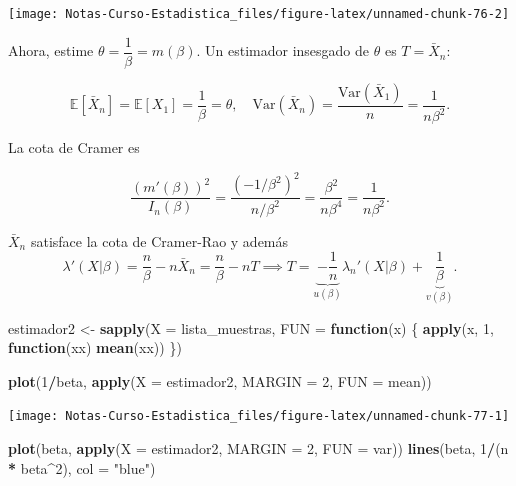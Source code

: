 \documentclass[
  12pt,
]{book}
\newenvironment{Shaded}{\begin{snugshade}}{\end{snugshade}}
\newcommand{\ControlFlowTok}[1]{\textcolor[rgb]{0.13,0.29,0.53}{\textbf{#1}}}
\newcommand{\DataTypeTok}[1]{\textcolor[rgb]{0.13,0.29,0.53}{#1}}
\newcommand{\DecValTok}[1]{\textcolor[rgb]{0.00,0.00,0.81}{#1}}
\newcommand{\KeywordTok}[1]{\textcolor[rgb]{0.13,0.29,0.53}{\textbf{#1}}}
\newcommand{\NormalTok}[1]{#1}
\newcommand{\OperatorTok}[1]{\textcolor[rgb]{0.81,0.36,0.00}{\textbf{#1}}}
\newcommand{\StringTok}[1]{\textcolor[rgb]{0.31,0.60,0.02}{#1}}
\begin{document}
\begin{center}\texttt{[image: Notas-Curso-Estadistica\_files/figure-latex/unnamed-chunk-76-2]} \end{center}

Ahora, estime \(\theta = \dfrac 1\beta = m(\beta)\). Un estimador insesgado de \(\theta\) es \(T =\bar X_n\):

\[\mathbb E[\bar X_n] = \mathbb E
[X_1] = \dfrac 1\beta  = \theta, \quad \text{Var}(\bar X_n) = \dfrac{\text{Var}(\bar X_1) }{n} = \dfrac 1{n\beta^2}.\]

La cota de Cramer es

\[\dfrac{(m'(\beta))^2}{I_n(\beta)} = \dfrac{(-1/\beta^2)^2}{n/\beta^2} = \dfrac{\beta^2}{n\beta^4} = \dfrac{1}{n\beta^2}.\]

\(\bar X_n\) satisface la cota de Cramer-Rao y además
\[\lambda'(X|\beta) = \dfrac n\beta - n\bar X_n =\dfrac n\beta - nT \implies T = \underbrace{-\dfrac 1n}_{u(\beta)}\lambda_n'(X|\beta)+ \underbrace{\dfrac 1\beta}_{v(\beta)}. \]

\begin{Shaded}
\begin{Highlighting}[]
\NormalTok{estimador2 \textless{}{-}}\StringTok{ }\KeywordTok{sapply}\NormalTok{(}\DataTypeTok{X =}\NormalTok{ lista\_muestras, }\DataTypeTok{FUN =} \ControlFlowTok{function}\NormalTok{(x) \{}
    \KeywordTok{apply}\NormalTok{(x, }\DecValTok{1}\NormalTok{, }\ControlFlowTok{function}\NormalTok{(xx) }\KeywordTok{mean}\NormalTok{(xx))}
\NormalTok{\})}

\KeywordTok{plot}\NormalTok{(}\DecValTok{1}\OperatorTok{/}\NormalTok{beta, }\KeywordTok{apply}\NormalTok{(}\DataTypeTok{X =}\NormalTok{ estimador2, }\DataTypeTok{MARGIN =} \DecValTok{2}\NormalTok{, }\DataTypeTok{FUN =}\NormalTok{ mean))}
\end{Highlighting}
\end{Shaded}

\begin{center}\texttt{[image: Notas-Curso-Estadistica\_files/figure-latex/unnamed-chunk-77-1]} \end{center}

\begin{Shaded}
\begin{Highlighting}[]
\KeywordTok{plot}\NormalTok{(beta, }\KeywordTok{apply}\NormalTok{(}\DataTypeTok{X =}\NormalTok{ estimador2, }\DataTypeTok{MARGIN =} \DecValTok{2}\NormalTok{, }\DataTypeTok{FUN =}\NormalTok{ var))}
\KeywordTok{lines}\NormalTok{(beta, }\DecValTok{1}\OperatorTok{/}\NormalTok{(n }\OperatorTok{*}\StringTok{ }\NormalTok{beta}\OperatorTok{\^{}}\DecValTok{2}\NormalTok{), }\DataTypeTok{col =} \StringTok{"blue"}\NormalTok{)}
\end{Highlighting}
\end{Shaded}
\end{document}
